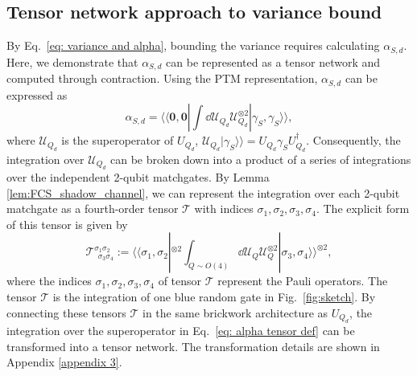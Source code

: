 \documentclass[showpacs,twocolumn,aps,prx,long bibliography,superscriptaddress,notitlepage]{revtex4-1}
\newcommand{\supket}[1]{|#1 \rangle\rangle}
\newcommand{\supbra}[1]{\langle\langle #1 |}
\newcommand{\Tcal}{\mathcal{T}}
\newcommand{\Ucal}{\mathcal{U}}
\begin{document}
\subsection{Tensor network approach to variance bound}
\label{sec: tensornet of alpha}
By Eq.~\eqref{eq: variance and alpha}, bounding the variance requires calculating $\alpha_{S,d}$. Here, we demonstrate that $\alpha_{S,d}$ can be represented as a tensor network and computed through contraction.
Using the PTM representation, $\alpha_{S,d}$ can be expressed as
\begin{equation}
\label{eq: alpha tensor def}
\alpha_{S,d} = \supbra{\bm 0,\bm 0}  \int \dd \Ucal_{Q_d} \mathcal{U}_{Q_d}^{\otimes 2} \supket{\gamma_S, \gamma_S},
\end{equation}
where $\mathcal{U}_{Q_d}$ is the superoperator of ${U}_{Q_d}$, $\mathcal{U}_{Q_d} \supket{\gamma_S} = U_{Q_d} \gamma_S U_{Q_d}^\dagger$.
Consequently, the integration over $\Ucal_{Q_d}$ can be broken down into a product of a series of integrations over the independent 2-qubit matchgates. 
By Lemma \ref{lem:FCS_shadow_channel}, we can represent the integration over each 2-qubit matchgate as a fourth-order tensor $\Tcal$ with indices $\sigma_1,\sigma_2, \sigma_3, \sigma_4$. The explicit form of this tensor is given by
\begin{equation}
\label{eq: T}
    \Tcal^{\sigma_1\sigma_2}_{~~\sigma_3\sigma_4} := \supbra{\sigma_1, \sigma_2}^{\otimes 2}  \int_{Q\sim O(4)} \dd \Ucal_{Q} \mathcal{U}_{Q}^{\otimes 2} \supket{\sigma_3, \sigma_4}^{\otimes 2} ,
\end{equation}
where the indices $\sigma_1, \sigma_2, \sigma_3, \sigma_4$ of tensor $\Tcal$ represent the Pauli operators. The tensor $\Tcal$ is the integration of one blue random gate in Fig.~\ref{fig:sketch}. 
By connecting these tensors $\Tcal$ in the same brickwork architecture as $ U_{Q_d} $, the integration over the superoperator in Eq.~\eqref{eq: alpha tensor def} can be transformed into a tensor network. The transformation details are shown in Appendix \ref{appendix 3}.
\end{document}
